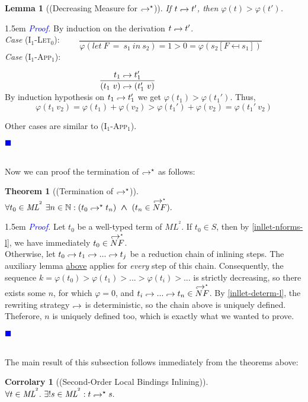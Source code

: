 \documentclass[a4paper,11pt,oneside]{article}
\theoremstyle{plain}
\newtheorem{lemma}[definition]{Lemma}
\newtheorem{theorem}[definition]{Theorem}
\newtheorem{corr}[definition]{Corrolary}
\renewenvironment{proof}{\noindent \begin{adjustwidth}{1.5em}{} \textcolor{blue}{\textit{Proof.}}}
{{\begin{tiny}\textcolor{blue}{$\blacksquare$}\end{tiny}}
\end{adjustwidth}~\\\noindent}
\newcommand{\bwedge}{\boldsymbol{~\wedge~}}
\newcommand{\inlsrc}{\textit{ML}^{^2}}
\newcommand{\inlT}{\inlsrc}
\newcommand{\hookdownarrow}{\mathrel{\rotatebox[origin=c]{180}{$\hookleftarrow$}}}
\newcommand{\inlletarr}{\hookdownarrow}
\newcommand{\inlletstar}{\hookdownarrow^{\star}}
\newcommand{\inlletplus}{\inlletstar}
\newcommand{\inlletNF}{\overset{\inlletplus}{NF}}
\newcommand{\inllett}[2]{#1 \inlletplus #2}
\newcommand{\ilarr}{\hookdownarrow}
\newcommand{\il}[2]{#1 \ilarr #2}
\begin{document}
\begin{lemma}[(Decreasing Measure for $\inlletplus$)] 
If $\il{t}{t'}$, then $\varphi(t) > \varphi(t')$.
\hypertarget{desc-meas-1}{}
\end{lemma}
\begin{proof}
By induction on the derivation $\il{t}{t'}$. \\

\noindent\textit{Case} (\textsc{I}$_{1}$-\textsc{Let}$_0$):
$\qquad \dfrac{}{\varphi(let~F~=~s_1~in~s_2) = 1 > 0 = \varphi(s_2 [F \mapsfrom s_1])}$\\[0.5cm]

\noindent\textit{Case} (\textsc{I}$_{1}$-\textsc{App}$_1$):

$  \hspace*{4cm}\dfrac{\il{t_1}{t_1'}}{\il{(t_1~v)}{(t_1'~v)}}$\\[0.6cm]
By induction hypothesis on $\il{t_1}{t_1'}$ we get $\varphi(t_1) > \varphi(t_1')$.
Thus, $${\varphi(t_1~v_2) = \varphi(t_1) + \varphi(v_2) > \varphi(t_1') + \varphi(v_2) = \varphi(t_1'~v_2)}$$

Other cases are similar to (\textsc{I}$_{1}$-\textsc{App}$_1$). \end{proof}
Now we can proof the termination of $\inlletplus$ as follows:
\begin{theorem}[(Termination of $\inlletplus$)] 
		$\forall t_0 \in \inlsrc ~
	 			\exists n \in \mathbb{N}:  
	 				  (\inllett{t_0}{t_n}) \bwedge (t_n \in \inlletNF).$
\label{inllet-term-l}
\end{theorem}
\begin{proof} 
	Let $t_0$ be a well-typed term of $\inlsrc$. 
	If	$t_0 \in S$, then by \cref{inllet-nforms-l}, we have immediately $t_0 \in \inlletNF$. \\
	
	Otherwise, let $t_0 \ilarr t_1 \ilarr ... \ilarr t_j$ be a reduction chain of inlining steps. 
	The auxiliary lemma \hyperlink{decr-meas-1}{above} applies for \textit{every} step of this chain.
	Consequently, the sequence $k = \varphi(t_0) > \varphi(t_1) >  ... > \varphi(t_i) > ... $ is strictly decreasing, so there exists some $n$, for which $\varphi = 0$, and $ t_{i} \inlletarr ... \inlletarr t_n \in \inlletNF$. 
	By \cref{inllet-determ-l}, the rewriting strategy $\inlletarr$ is deterministic, so the chain above is uniquely defined.
	Theferore, $n$ is uniquely defined too, which is exactly what we wanted to prove. 	
\end{proof}
The main result of this subsection follows immediately from the theorems above:
\begin{corr}[(Second-Order Local Bindings Inlining)] 
~\\
 $\forall t \in \inlT.~ \exists !s \in \inlT: \inllett{t}{s}.$
\label{inllet-corr}
\end{corr}
\end{document}
